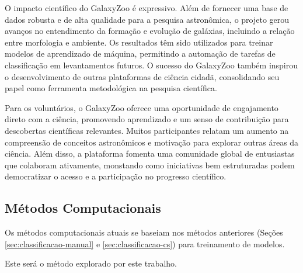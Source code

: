O impacto científico do GalaxyZoo é expressivo. Além de fornecer uma base de dados robusta e de alta qualidade para a pesquisa astronômica, o projeto gerou avanços no entendimento da formação e evolução de galáxias, incluindo a relação entre morfologia e ambiente. Os resultados têm sido utilizados para treinar modelos de aprendizado de máquina, permitindo a automação de tarefas de classificação em levantamentos futuros. O sucesso do GalaxyZoo também inspirou o desenvolvimento de outras plataformas de ciência cidadã, consolidando seu papel como ferramenta metodológica na pesquisa científica.

Para os voluntários, o GalaxyZoo oferece uma oportunidade de engajamento direto com a ciência, promovendo aprendizado e um senso de contribuição para descobertas científicas relevantes. Muitos participantes relatam um aumento na compreensão de conceitos astronômicos e motivação para explorar outras áreas da ciência. Além disso, a plataforma fomenta uma comunidade global de entusiastas que colaboram ativamente, monstando como iniciativas bem estruturadas podem democratizar o acesso e a participação no progresso científico.




\subsection{Métodos Computacionais}
\label{sec:classificacao-comp}

Os métodos computacionais atuais se baseiam nos métodos anteriores (Seções \ref{sec:classificacao-manual} e \ref{sec:classificacao-cs}) para treinamento de modelos.

\lipsum[1-2]

Este será o método explorado por este trabalho.












\chaptersep
